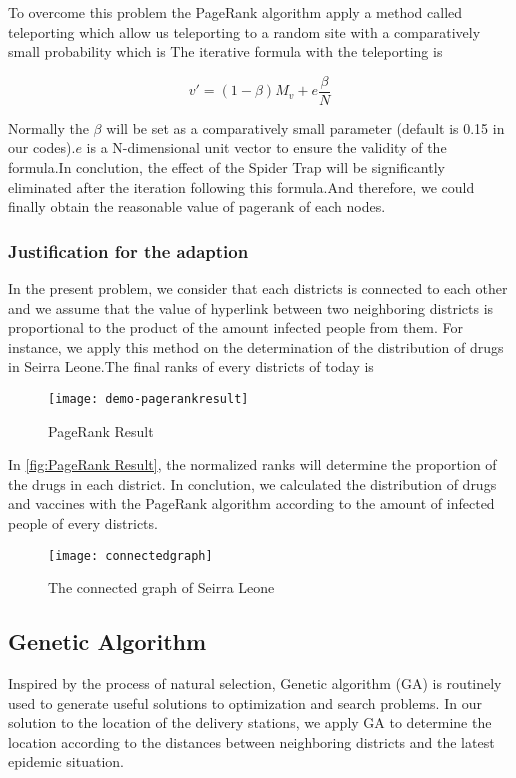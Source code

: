 To overcome this problem the PageRank algorithm apply a method called teleporting which allow us teleporting to a random site with a comparatively small probability which is  
The iterative formula with the teleporting is 

\begin{equation}
v\prime=(1-\beta)M_v+e\frac{\beta}{N}
\end{equation}


Normally the $\beta$ will be set as a comparatively small parameter (default is 0.15 in our codes).$e$ is a N-dimensional unit vector to ensure the validity of the formula.In conclution, the effect of the Spider Trap will be significantly eliminated after the iteration following this formula.And therefore, we could finally obtain the reasonable value of pagerank of each nodes.

\subsubsection{Justification for the adaption}

In the present problem, we consider that each districts is connected to each other and we assume that the value of hyperlink between two neighboring districts is proportional to the product of the amount infected people from them. For instance, we apply this method on the determination of the distribution of drugs in Seirra Leone.The final ranks of every districts of today is

\begin{figure}[ht]
\small
\centering
\texttt{[image: demo-pagerankresult]}
\caption{PageRank Result}
\label{fig:PageRank Result}
\end{figure}

In \autoref{fig:PageRank Result}, the normalized ranks will determine the proportion of the drugs in each district. In conclution, we calculated the distribution of drugs and vaccines with the PageRank algorithm according to the amount of infected people of every districts. 

\begin{figure}[ht]
\small
\centering
\texttt{[image: connectedgraph]}
\caption{The connected graph of Seirra Leone}
\label{fig:connectedgraph}
\end{figure}



\subsection{Genetic Algorithm}
Inspired by the process of natural selection, Genetic algorithm (GA) is routinely used to generate useful solutions to optimization and search problems. In our solution to the location of the delivery stations, we apply GA to determine the location according to the distances between neighboring districts and the latest epidemic situation.  

